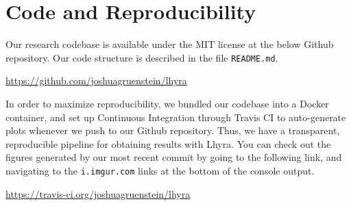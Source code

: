 \documentclass[11pt]{article}
\begin{document}



\appendix
\section{Code and Reproducibility}

Our research codebase is available under the MIT license at the below Github repository.  Our code structure is described in the file \texttt{README.md}.

\begin{center}
\url{https://github.com/joshuagruenstein/lhyra}
\end{center}

In order to maximize reproducibility, we bundled our codebase into a Docker container, and set up Continuous Integration through Travis CI to auto-generate plots whenever we push to our Github repository.  Thus, we have a transparent, reproducible pipeline for obtaining results with Lhyra.  You can check out the figures generated by our most recent commit by going to the following link, and navigating to the \texttt{i.imgur.com} links at the bottom of the console output.

\begin{center}
\url{https://travis-ci.org/joshuagruenstein/lhyra}
\end{center}
\end{document}
